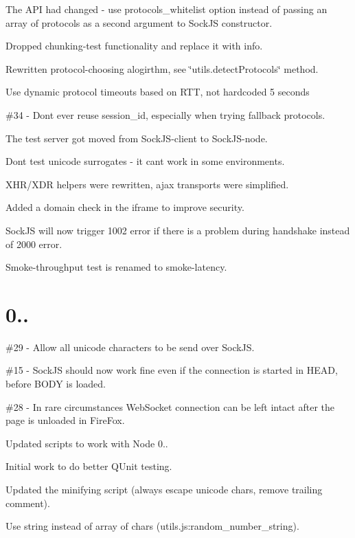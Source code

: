 \begin{DoxyItemize}
\item The A\+PI had changed -\/ use {\ttfamily protocols\+\_\+whitelist} option instead of passing an array of protocols as a second argument to Sock\+JS constructor.
\item Dropped \textquotesingle{}chunking-\/test\textquotesingle{} functionality and replace it with \textquotesingle{}info\textquotesingle{}.
\item Rewritten protocol-\/choosing alogirthm, see \char`\"{}utils.\+detect\+Protocols\char`\"{} method.
\item Use dynamic protocol timeouts based on R\+TT, not hardcoded 5 seconds
\item \#34 -\/ Don\textquotesingle{}t ever reuse {\ttfamily session\+\_\+id}, especially when trying fallback protocols.
\item The test server got moved from Sock\+J\+S-\/client to Sock\+J\+S-\/node.
\item Don\textquotesingle{}t test unicode surrogates -\/ it can\textquotesingle{}t work in some environments.
\item X\+H\+R/\+X\+DR helpers were rewritten, ajax transports were simplified.
\item Added a domain check in the iframe to improve security.
\item Sock\+JS will now trigger 1002 error if there is a problem during handshake instead of 2000 error.
\item Smoke-\/throughput test is renamed to smoke-\/latency.
\end{DoxyItemize}

\section*{0.. }


\begin{DoxyItemize}
\item \#29 -\/ Allow all unicode characters to be send over Sock\+JS.
\item \#15 -\/ Sock\+JS should now work fine even if the connection is started in H\+E\+AD, before B\+O\+DY is loaded.
\item \#28 -\/ In rare circumstances Web\+Socket connection can be left intact after the page is unloaded in Fire\+Fox.
\item Updated scripts to work with Node 0..
\item Initial work to do better Q\+Unit testing.
\item Updated the minifying script (always escape unicode chars, remove trailing comment).
\item Use string instead of array of chars (utils.\+js\+:random\+\_\+number\+\_\+string).
\end{DoxyItemize}

